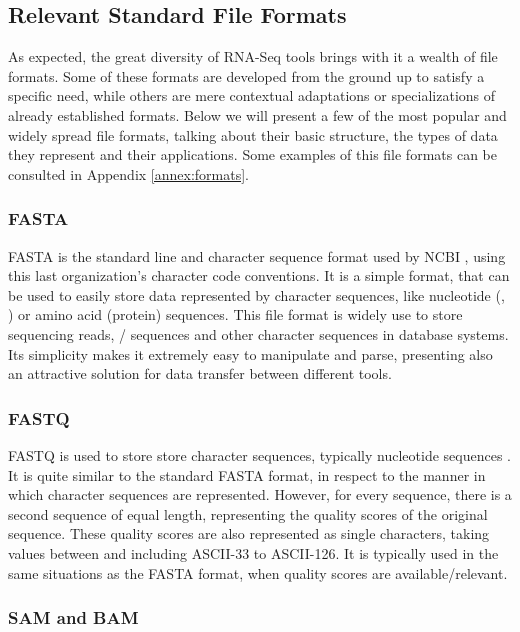 \subsection{Relevant Standard File Formats}\label{sec:formats}

As expected, the great diversity of RNA-Seq tools brings with it a wealth of
file formats. Some of these formats are developed from the ground up to satisfy
a specific need, while others are mere contextual adaptations or specializations
of already established formats. Below we will present a few of the most popular
and widely spread file formats, talking about their basic structure, the types
of data they represent and their applications. Some examples of this file
formats can be consulted in Appendix \ref{annex:formats}.

\subsubsection*{FASTA}

FASTA is the standard line and character sequence format used by NCBI
\cite{ncbi:fasta}, using this last organization's character code conventions. It
is a simple format, that can be used to easily store data represented by
character sequences, like nucleotide (\dna, \rna) or amino acid (protein)
sequences. This file format is widely use to store sequencing reads, \dna/\rna{}
sequences and other character sequences in database systems. Its simplicity
makes it extremely easy to manipulate and parse, presenting also an attractive
solution for data transfer between different tools.

\subsubsection*{FASTQ}

FASTQ is used to store store character sequences, typically nucleotide sequences
\cite{Cock2010}. It is quite similar to the standard FASTA format, in respect to
the manner in which character sequences are represented. However, for every
sequence, there is a second sequence of equal length, representing the quality
scores of the original sequence. These quality scores are also represented as
single characters, taking values between and including ASCII-33 to ASCII-126.
It is typically used in the same situations as the FASTA format, when quality
scores are available/relevant.

\subsubsection*{SAM and BAM}

